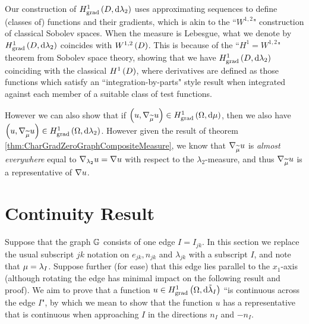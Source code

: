 \documentclass[11pt]{report}
\newcommand{\tlambda}{\tilde{\lambda}}
\begin{document}
\begin{convention}[] \label{conv:ConsistencyOfConstructionH1}
Our construction of $H^1_\mathrm{grad}\left( D, \mathrm{d}\lambda_2 \right)$ uses approximating sequences to define (classes of) functions and their gradients, which is akin to the ``$W^{1,2}$" construction of classical Sobolev spaces.
When the measure is Lebesgue, what we denote by $H^1_\mathrm{grad}\left( D, \mathrm{d}\lambda_2 \right)$ coincides with $W^{1,2}\left( D \right)$.
This is because of the ``$H^1 = W^{1,2}$" theorem from Sobolev space theory, showing that we have $H^1_\mathrm{grad}\left( D, \mathrm{d}\lambda_2 \right)$ coinciding with the classical $H^1\left( D \right)$, where derivatives are defined as those functions which satisfy an ``integration-by-parts" style result when integrated against each member of a suitable class of test functions. \newline

However we can also show that if $\left( u,\nabla_{\widetilde{\mu}} u \right)\in H^1_\mathrm{grad}\left( \Omega, \mathrm{d}\mu \right)$, then we also have $\left( u,\nabla_{\widetilde{\mu}} u \right)\in H^1_\mathrm{grad}\left( \Omega, \mathrm{d}\lambda_2 \right)$.
However given the result of theorem \ref{thm:CharGradZeroGraphCompositeMeasure}, we know that $\nabla_{\widetilde{\mu}} u$ is \emph{almost everywhere} equal to $\nabla_{\lambda_2}u = \nabla u$ with respect to the $\lambda_2$-measure, and thus $\nabla_{\widetilde{\mu}} u$ is a representative of $\nabla u$.
\end{convention}

\chapter*{Continuity Result}
Suppose that the graph $\mathbb{G}$ consists of one edge $I=I_{jk}$.
In this section we replace the usual subscript $jk$ notation on $e_{jk}, n_{jk}$ and $\lambda_{jk}$ with a subscript $I$, and note that $\mu = \lambda_I$.
Suppose further (for ease) that this edge lies parallel to the $x_1$-axis (although rotating the edge has minimal impact on the following result and proof).
We aim to prove that a function $u\in\gradSob{\ddom}{\tlambda_I}$ ``is continuous across the edge $I$", by which we mean to show that the function $u$ has a representative that is continuous when approaching $I$ in the directions $n_I$ and $-n_I$.
\end{document}
